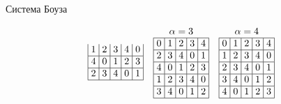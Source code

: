 \documentclass[8pt, hyperref={pdftex,unicode}, green]{beamer}
\begin{document}
\begin{frame}{Система Боуза}
\begin{block}{}
\begin{gather*}
\begin{array}{|>{\hspace{-2pt}}c<{\hspace{-2pt}}|>{\hspace{-2pt}}c<{\hspace{-2pt}}|>{\hspace{-2pt}}c<{\hspace{-2pt}}|>{\hspace{-2pt}}c<{\hspace{-2pt}}|>{\hspace{-2pt}}c<{\hspace{-2pt}}|}
            1 & 2 & 3 & 4 & 0 \\ \hline
            4 & 0 & 1 & 2 & 3 \\ \hline
            2 & 3 & 4 & 0 & 1 \\ \hline
        \end{array}\hspace{1em}
        \begin{array}{|>{\hspace{-2pt}}c<{\hspace{-2pt}}|>{\hspace{-2pt}}c<{\hspace{-2pt}}|>{\hspace{-2pt}}c<{\hspace{-2pt}}|>{\hspace{-2pt}}c<{\hspace{-2pt}}|>{\hspace{-2pt}}c<{\hspace{-2pt}}|} 
            \multicolumn{5}{c}{\alpha = 3} \\ \hline
            0 & 1 & 2 & 3 & 4 \\ \hline
            2 & 3 & 4 & 0 & 1 \\ \hline
            4 & 0 & 1 & 2 & 3 \\ \hline
            1 & 2 & 3 & 4 & 0 \\ \hline
            3 & 4 & 0 & 1 & 2 \\ \hline
        \end{array}\hspace{1em}
        \begin{array}{|>{\hspace{-2pt}}c<{\hspace{-2pt}}|>{\hspace{-2pt}}c<{\hspace{-2pt}}|>{\hspace{-2pt}}c<{\hspace{-2pt}}|>{\hspace{-2pt}}c<{\hspace{-2pt}}|>{\hspace{-2pt}}c<{\hspace{-2pt}}|} 
            \multicolumn{5}{c}{\alpha = 4} \\ \hline
            0 & 1 & 2 & 3 & 4 \\ \hline
            1 & 2 & 3 & 4 & 0 \\ \hline
            2 & 3 & 4 & 0 & 1 \\ \hline
            3 & 4 & 0 & 1 & 2 \\ \hline
            4 & 0 & 1 & 2 & 3 \\ \hline
        \end{array}
    \end{gather*}
    \end{block}
  
\end{frame}
\end{document}
